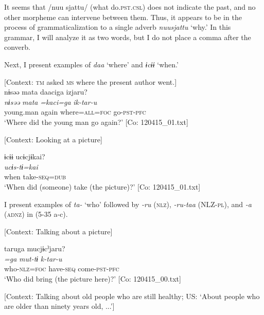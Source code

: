 It seems that /nuu sjattu/ (what do.\textsc{pst}.\textsc{csl}) does not indicate the past, and no other morpheme can intervene between them. Thus, it appears to be in the process of grammaticalization to a single adverb \textit{nuusjattu} ‘why.’ In this grammar, I will analyze it as two words, but I do not place a comma after the converb.

  Next, I present examples of \textit{daa} ‘where’ and \textit{ɨcɨɨ} ‘when.’

\ea \label{ex:5:34}  \ea \label{ex:5:a} [Context: \textsc{tm} asked \textsc{ms} where the present author went.]\\
\glll  nɨsəə  mata  daaciga  izjaru?\\
\textit{nɨsəə}  \textit{mata}  \textit{=kaci=ga}  \textit{ik-tar-u}\\
young.man  again  where=\textsc{all}=\textsc{foc}  go-\textsc{pst}-\textsc{pfc}\\
\glt ‘Where did the young man go again?’ [Co: 120415\_01.txt]

 \ex \label{ex:35:b} [Context: Looking at a picture]

\glll  ɨcɨɨ  ucɨcjɨkai?\\
\textit{}  \textit{ucɨs-tɨ=kai}\\
when  take-\textsc{seq}=\textsc{dub}\\
\glt ‘When did (someone) take (the picture)?’ [Co: 120415\_01.txt]
\z
\z

  I present examples of \textit{ta-} ‘who’ followed by \textit{{}-ru} (\textsc{nlz}), \textit{{}-ru-taa} (NLZ-\textsc{pl}), and \textit{{}-a} (\textsc{adnz}) in (5-35 a-c).

\ea \label{ex:5:35}  \ea \label{ex:35:a} [Context: Talking about a picture]

\glll  taruga  mucjɨ\footnotemark  cˀjaru?\\
\textit{=ga}  \textit{mut-tɨ}  \textit{k-tar-u}\\
who-\textsc{nlz}=\textsc{foc}  have-\textsc{seq}  come-\textsc{pst}-\textsc{pfc}\\
\glt ‘Who did bring (the picture here)?’ [Co: 120415\_00.txt]

 \ex \label{ex:35:b} [Context: Talking about old people who are still healthy; US: ‘About people who are older than ninety years old, ...’]

